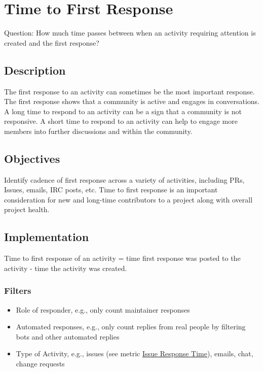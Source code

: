 \hypertarget{time-to-first-response}{%
\section{Time to First Response}\label{time-to-first-response}}

Question: How much time passes between when an activity requiring
attention is created and the first response?

\hypertarget{description}{%
\subsection{Description}\label{description}}

The first response to an activity can sometimes be the most important
response. The first response shows that a community is active and
engages in conversations. A long time to respond to an activity can be a
sign that a community is not responsive. A short time to respond to an
activity can help to engage more members into further discussions and
within the community.

\hypertarget{objectives}{%
\subsection{Objectives}\label{objectives}}

Identify cadence of first response across a variety of activities,
including PRs, Issues, emails, IRC posts, etc. Time to first response is
an important consideration for new and long-time contributors to a
project along with overall project health.

\hypertarget{implementation}{%
\subsection{Implementation}\label{implementation}}

Time to first response of an activity = time first response was posted
to the activity - time the activity was created.

\hypertarget{filters}{%
\subsubsection{Filters}\label{filters}}

\begin{itemize}
\tightlist
\item
  Role of responder, e.g., only count maintainer responses
\item
  Automated responses, e.g., only count replies from real people by
  filtering bots and other automated replies
\item
  Type of Activity, e.g., issues (see metric
  \href{https://github.com/chaoss/wg-evolution/blob/master/metrics/Issue_Response_Time.md}{Issue
  Response Time}), emails, chat, change requests
\end{itemize}

